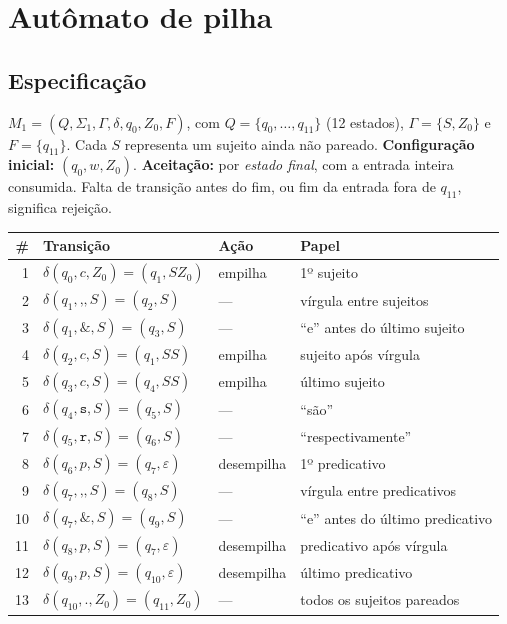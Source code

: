 \documentclass[11pt,a4paper]{article}
\newcommand{\cad}[1]{\texttt{#1}}       %
\begin{document}
\section{Autômato de pilha}

\subsection{Especificação}

$M_1=(Q,\Sigma_1,\Gamma,\delta,q_0,Z_0,F)$, com
$Q=\{q_0,\dots,q_{11}\}$ (12 estados), $\Gamma=\{S,Z_0\}$ e $F=\{q_{11}\}$. Cada $S$ representa um sujeito ainda não pareado.
\textbf{Configuração inicial:} $(q_0, w, Z_0)$.
\textbf{Aceitação:} por \emph{estado final}, com a entrada inteira consumida. Falta de transição antes do fim, ou fim da entrada fora de $q_{11}$, significa rejeição.

\begin{center}
\begin{tabular}{rlll}
\toprule
\# & Transição & Ação & Papel \\
\midrule
1 & $\delta(q_0, c, Z_0)=(q_1, SZ_0)$ & empilha & 1º sujeito \\
2 & $\delta(q_1, \cad{,}, S)=(q_2, S)$ & --- & vírgula entre sujeitos \\
3 & $\delta(q_1, \cad{\&}, S)=(q_3, S)$ & --- & ``e'' antes do último sujeito \\
4 & $\delta(q_2, c, S)=(q_1, SS)$ & empilha & sujeito após vírgula \\
5 & $\delta(q_3, c, S)=(q_4, SS)$ & empilha & último sujeito \\
6 & $\delta(q_4, \cad{s}, S)=(q_5, S)$ & --- & ``são'' \\
7 & $\delta(q_5, \cad{r}, S)=(q_6, S)$ & --- & ``respectivamente'' \\
8 & $\delta(q_6, p, S)=(q_7, \varepsilon)$ & desempilha & 1º predicativo \\
9 & $\delta(q_7, \cad{,}, S)=(q_8, S)$ & --- & vírgula entre predicativos \\
10 & $\delta(q_7, \cad{\&}, S)=(q_9, S)$ & --- & ``e'' antes do último predicativo \\
11 & $\delta(q_8, p, S)=(q_7, \varepsilon)$ & desempilha & predicativo após vírgula \\
12 & $\delta(q_9, p, S)=(q_{10}, \varepsilon)$ & desempilha & último predicativo \\
13 & $\delta(q_{10}, \cad{.}, Z_0)=(q_{11}, Z_0)$ & --- & todos os sujeitos pareados \\
\bottomrule
\end{tabular}
\end{center}
\end{document}
